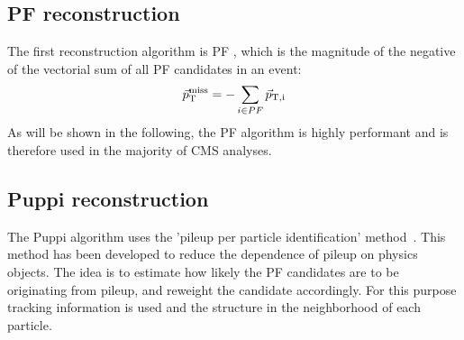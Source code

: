\subsection{PF \ptmiss reconstruction}
The first reconstruction algorithm is PF \ptmiss, which is the magnitude of the negative of the vectorial sum of all PF candidates in an event:
\begin{equation}
\vec{p}_{\rm{T}}^{\rm{ miss}} =- \sum_{i\in PF} \vec{p}_\mathrm{T, i}
\label{eq:MET}
\end{equation}                                                                      
As will be shown in the following, the PF \ptmiss algorithm is highly performant and is therefore used in the majority of CMS analyses.
 
\subsection{Puppi \ptmiss reconstruction}
The Puppi \ptmiss algorithm uses the 'pileup per particle identification' method~\cite{Bertolini:2014bba}. This method has been developed to reduce the dependence of pileup on physics objects. The idea is to estimate how likely the PF candidates are to be originating from pileup, and reweight the candidate accordingly. For this purpose tracking information is used and the structure in the neighborhood of each particle.  
\clearpage

